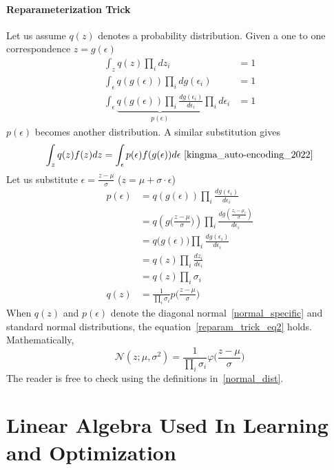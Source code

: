 \documentclass{book}
\numberwithin{equation}{subsection}
\begin{document}
\subsubsection{Reparameterization Trick}
\label{reparam_trick}
Let us assume $q(z)$ denotes a probability distribution. Given a one to one correspondence $z = g(\epsilon)$
\begin{align}
    \int_z q(z)\prod_i dz_i &= 1\\
    \int_\epsilon q(g(\epsilon))\prod_i dg(\epsilon_i) &= 1\\
    \int_\epsilon \underbrace{q(g(\epsilon))\prod_i \frac{dg(\epsilon_i)}{d\epsilon_i}}_{p(\epsilon)}\prod_i d\epsilon_i &= 1
\end{align}
$p(\epsilon)$ becomes another distribution. A similar substitution gives
\begin{equation}
    \int_z q(z)f(z)dz = \int_\epsilon p(\epsilon)f(g(\epsilon))d\epsilon~\cite{kingma_auto-encoding_2022}\label{reparam_trick_eq1}
\end{equation}
Let us substitute $\epsilon = \frac{z-\mu}{\sigma}$ ($z=\mu+\sigma \cdot \epsilon$)
\begin{align}
    p(\epsilon) 
    &= q(g(\epsilon))\prod_i \frac{dg(\epsilon_i)}{d\epsilon_i}\\ 
    &= q\left(g\Big(\frac{z-\mu}{\sigma}\Big)\right)\prod_i \frac{dg(\frac{z_i-\mu_i}{\sigma})}{d\epsilon_i}\\
    &= q\big(g(\epsilon)\big)\prod_i \frac{dg(\epsilon_i)}{d\epsilon_i}\\
    &= q(z)\prod_i \frac{dz_i}{d\epsilon_i}\\
    &= q(z)\prod_i \sigma_i\\
    q(z) &= \frac{1}{\prod_i \sigma_i}p\Big(\frac{z-\mu}{\sigma}\Big)\label{reparam_trick_eq2}
\end{align}
When $q(z)$ and $p(\epsilon)$ denote the diagonal normal~\ref{normal_specific} and standard normal distributions, the equation~\ref{reparam_trick_eq2} holds. Mathematically,
\begin{equation}
    \mathcal{N}(z;\mu, \sigma^2) = \frac{1}{\prod_i \sigma_i}\varphi\Big(\frac{z-\mu}{\sigma}\Big)
\end{equation}
The reader is free to check using the definitions in~\ref{normal_dist}.
\chapter{Linear Algebra Used In Learning and Optimization}
\end{document}
